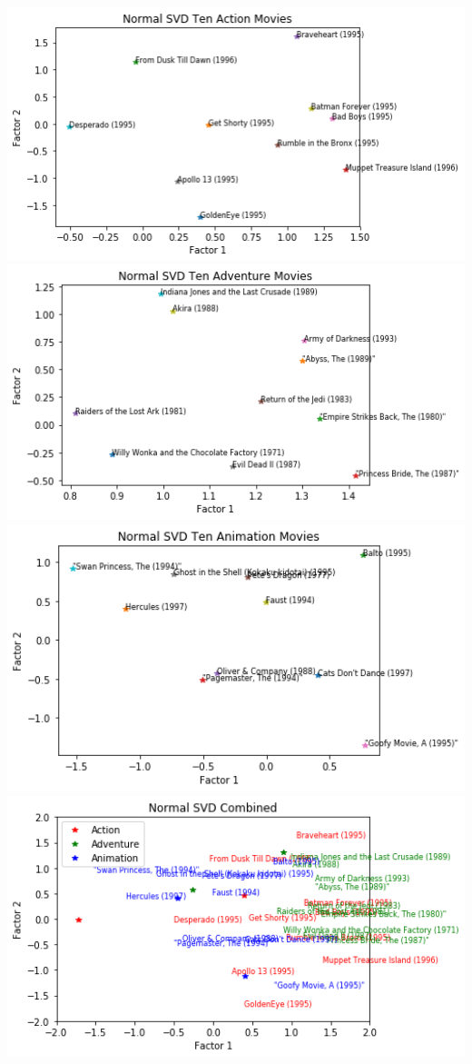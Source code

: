 \begin{center}
	\includegraphics[width=16cm]{Pictures/Normal_action}
	\includegraphics[width=16cm]{Pictures/Normal_adventure}
	\includegraphics[width=16cm]{Pictures/Normal_animation}
	\includegraphics[width=16cm]{Pictures/Normal_combined}
\end{center}
